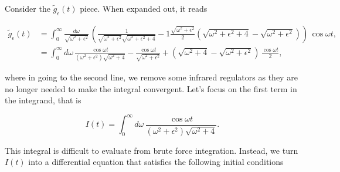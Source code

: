 \documentclass{article}
\numberwithin{equation}{section} %
\begin{document}
Consider the $\tilde{g}_\epsilon(t)$ piece. When expanded out, it reads


\begin{equation}
\begin{split}
\tilde{g}_\epsilon(t) &= \int^\infty_0 \frac{d\omega}{\sqrt{\omega^2+\epsilon^2}}\, \left( \frac{1}{\sqrt{\omega^2+\epsilon^2}\sqrt{\omega^2+\epsilon^2+4}} - 1 \frac{\sqrt{\omega^2+\epsilon^2}}{2}(\sqrt{\omega^2+\epsilon^2+4} - \sqrt{\omega^2+\epsilon^2}) \right) \, \cos\omega t,\\
&= \int^\infty_0 d\omega\, \frac{\cos\omega t}{(\omega^2+\epsilon^2)\sqrt{\omega^2+4}} - \frac{\cos \omega t}{\sqrt{\omega^2+\epsilon^2}} + (\sqrt{\omega^2+4} - \sqrt{\omega^2+\epsilon^2}) \, \frac{\cos \omega t}{2},
\end{split}
\label{g_epsilon}
\end{equation}

\noindent where in going to the second line, we remove some infrared regulators as they are no longer needed to make the integral convergent. Let's focus on the first term in the integrand, that is

\begin{equation}
I(t) = \int^\infty_0 d\omega\, \frac{\cos \omega t}{(\omega^2+\epsilon^2)\sqrt{\omega^2+4}}.
\end{equation}

\noindent This integral is difficult to evaluate from brute force integration. Instead, we turn $I(t)$ into a differential equation that satisfies the following initial conditions
\end{document}
